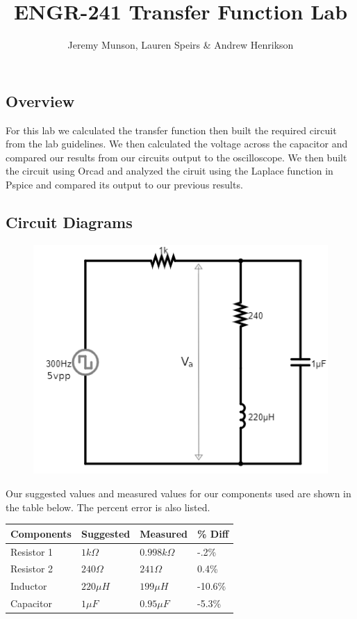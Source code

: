 \documentclass[11pt]{article}
\title{ENGR-241 Transfer Function Lab}
\author{Jeremy Munson, Lauren Speirs \& Andrew Henrikson}
\begin{document}
	\maketitle
	\subsection*{Overview}
	For this lab we calculated the transfer function then built the required circuit from the lab guidelines. We then calculated the voltage across the capacitor and compared our results from our circuits output to the oscilloscope. We then built the circuit using Orcad and analyzed the ciruit using the Laplace function in Pspice and compared its output to our previous results.
		\subsection*{Circuit Diagrams}
		\begin{figure}[H]
			\centering
			\includegraphics[width=5in]{images/diagram.png}
		\end{figure}
		
		Our suggested values and measured values for our components used are shown in the table below. The percent error is also listed.
		\begin{table}[H]
		\def\arraystretch{1.2}%
		\centering
		\begin{tabular}{|l|l|l|l|}
			
			\hline
			Components       	& Suggested 		& Measured      	&\% Diff	\\ \hline
			Resistor 1   		& $1 k\Omega$		& $0.998 k\Omega$   & -.2\%	     \\ \hline	
			Resistor 2			& $240 \Omega$		& $241 \Omega$      & 0.4\%       \\ \hline
			Inductor			& $220\mu H$		& $199\mu H$		& -10.6\%		\\ \hline
			Capacitor			& $1 \mu F$			& $0.95 \mu F$		& -5.3\%		\\ \hline
		\end{tabular}
	\end{table}
\end{document}
